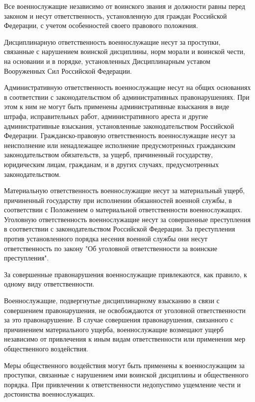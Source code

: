 \documentclass[12pt,a4paper]{report}
\begin{document}
Все военнослужащие независимо от воинского звания и должности равны перед законом и несут ответственность, установленную для граждан Российской Федерации, с учетом особенностей своего правового положения.

Дисциплинарную ответственность военнослужащие несут за проступки, связанные с нарушением воинской дисциплины, норм морали и воинской чести, на основании и в порядке, установленных Дисциплинарным уставом Вооруженных Сил Российской Федерации.

Административную ответственность военнослужащие несут на общих основаниях в соответствии с законодательством об административных правонарушениях. При этом к ним не могут быть применены административные взыскания в виде штрафа, исправительных работ, административного ареста и другие административные взыскания, установленные законодательством Российской Федерации.
Гражданско-правовую ответственность военнослужащие несут за неисполнение или ненадлежащее исполнение предусмотренных гражданским законодательством обязательств, за ущерб, причиненный государству, юридическим лицам, гражданам, и в других случаях, предусмотренных законодательством.

Материальную ответственность военнослужащие несут за материальный ущерб, причиненный государству при исполнении обязанностей военной службы, в соответствии с Положением о материальной ответственности военнослужащих.
Уголовную ответственность военнослужащие несут за совершенные преступления в соответствии с законодательством Российской Федерации. За преступления против установленного порядка несения военной службы они несут ответственность по закону "Об уголовной ответственности за воинские преступления".

За совершенные правонарушения военнослужащие привлекаются, как правило, к одному виду ответственности.

Военнослужащие, подвергнутые дисциплинарному взысканию в связи с совершением правонарушения, не освобождаются от уголовной ответственности за это правонарушение.
В случае совершения правонарушения, связанного с причинением материального ущерба, военнослужащие возмещают ущерб независимо от привлечения к иным видам ответственности или применения мер общественного воздействия.

Меры общественного воздействия могут быть применены к военнослужащим за проступки, связанные с нарушением ими воинской дисциплины и общественного порядка.
При привлечении к ответственности недопустимо ущемление чести и достоинства военнослужащих.
 
\end{document}
